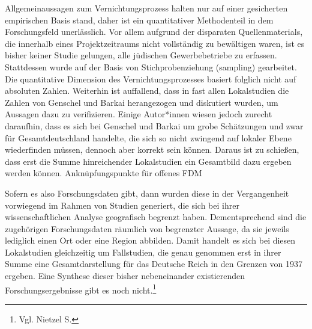 Allgemeinaussagen zum Vernichtungsprozess halten nur auf einer gesicherten empirischen Basis stand, daher ist ein quantitativer Methodenteil in dem Forschungsfeld unerlässlich. Vor allem aufgrund der disparaten Quellenmaterials, die innerhalb eines Projektzeitraums nicht vollständig zu bewältigen waren, ist es bisher keiner Studie gelungen, alle jüdischen Gewerbebetriebe zu erfassen. Stattdessen wurde auf der Basis von Stichprobenziehung (sampling) gearbeitet. Die quantitative Dimension des Vernichtungsprozesses basiert folglich nicht auf absoluten Zahlen.
Weiterhin ist auffallend, dass in fast allen Lokalstudien die Zahlen von Genschel und Barkai herangezogen und diskutiert wurden, um Aussagen dazu zu verifizieren. Einige Autor*innen wiesen jedoch zurecht daraufhin, dass es sich bei Genschel und Barkai um grobe Schätzungen und zwar für Gesamtdeutschland handelte, die sich so nicht zwingend auf lokaler Ebene wiederfinden müssen, dennoch aber korrekt sein können. Daraus ist zu schießen, dass erst die Summe hinreichender Lokalstudien ein Gesamtbild dazu ergeben werden können.
Anknüpfungspunkte für offenes FDM

Sofern es also Forschungsdaten gibt, dann wurden diese in der Vergangenheit vorwiegend im Rahmen von Studien generiert, die sich bei ihrer wissenschaftlichen Analyse geografisch begrenzt haben. Dementsprechend sind die zugehörigen Forschungsdaten räumlich von begrenzter Aussage, da sie jeweils lediglich einen Ort oder eine Region abbilden. Damit handelt es sich bei diesen Lokalstudien gleichzeitig um Fallstudien, die genau genommen erst in ihrer Summe eine Gesamtdarstellung für das Deutsche Reich in den Grenzen von 1937 ergeben. Eine Synthese dieser bisher nebeneinander existierenden Forschungsergebnisse gibt es noch nicht.\footnote{Vgl. Nietzel S.}